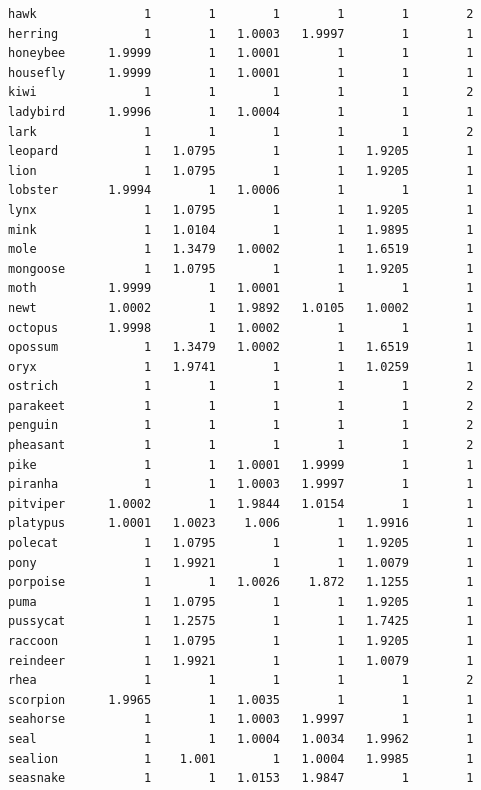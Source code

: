 \documentclass[11pt,a4paper]{article}
\begin{document}
\begin{verbatim}
hawk               1        1        1        1        1        2
herring            1        1   1.0003   1.9997        1        1
honeybee      1.9999        1   1.0001        1        1        1
housefly      1.9999        1   1.0001        1        1        1
kiwi               1        1        1        1        1        2
ladybird      1.9996        1   1.0004        1        1        1
lark               1        1        1        1        1        2
leopard            1   1.0795        1        1   1.9205        1
lion               1   1.0795        1        1   1.9205        1
lobster       1.9994        1   1.0006        1        1        1
lynx               1   1.0795        1        1   1.9205        1
mink               1   1.0104        1        1   1.9895        1
mole               1   1.3479   1.0002        1   1.6519        1
mongoose           1   1.0795        1        1   1.9205        1
moth          1.9999        1   1.0001        1        1        1
newt          1.0002        1   1.9892   1.0105   1.0002        1
octopus       1.9998        1   1.0002        1        1        1
opossum            1   1.3479   1.0002        1   1.6519        1
oryx               1   1.9741        1        1   1.0259        1
ostrich            1        1        1        1        1        2
parakeet           1        1        1        1        1        2
penguin            1        1        1        1        1        2
pheasant           1        1        1        1        1        2
pike               1        1   1.0001   1.9999        1        1
piranha            1        1   1.0003   1.9997        1        1
pitviper      1.0002        1   1.9844   1.0154        1        1
platypus      1.0001   1.0023    1.006        1   1.9916        1
polecat            1   1.0795        1        1   1.9205        1
pony               1   1.9921        1        1   1.0079        1
porpoise           1        1   1.0026    1.872   1.1255        1
puma               1   1.0795        1        1   1.9205        1
pussycat           1   1.2575        1        1   1.7425        1
raccoon            1   1.0795        1        1   1.9205        1
reindeer           1   1.9921        1        1   1.0079        1
rhea               1        1        1        1        1        2
scorpion      1.9965        1   1.0035        1        1        1
seahorse           1        1   1.0003   1.9997        1        1
seal               1        1   1.0004   1.0034   1.9962        1
sealion            1    1.001        1   1.0004   1.9985        1
seasnake           1        1   1.0153   1.9847        1        1

\end{verbatim}
\end{document}
